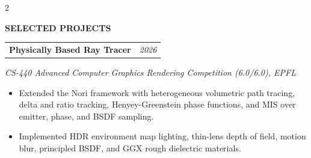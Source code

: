 \documentclass[10pt, letterpaper]{article}
\makeatletter
\newcommand{\sectionlabel}[1]{%
  {\fontsize{9.5pt}{11pt}\selectfont\bfseries\MakeUppercase{#1}}%
}
\newenvironment{cvsection}[1]{%
  \par\vspace{0.86\baselineskip}%
  \Needspace{3\baselineskip}%
  \setcolumnwidth{1.10in,\fill}%
  \begin{paracol}{2}%
  \raggedright\sectionlabel{#1}%
  \switchcolumn
}{%
  \end{paracol}%
}
\newcommand{\externalicon}[1]{%
  \href{#1}{\raisebox{0.12ex}{\normalfont\scriptsize\faExternalLink*}}%
}
\newcommand{\researchentry}[2]{%
  \noindent\begin{tabularx}{\linewidth}{@{}Xr@{}}
    \textbf{#1} & \textit{#2}
  \end{tabularx}%
}
\newcommand{\projectentry}[2]{%
  \noindent\begin{tabularx}{\linewidth}{@{}Xr@{}}
    \textbf{#1} & \textit{#2}
  \end{tabularx}%
}
\makeatother
\begin{document}
\begin{cvsection}{Selected Projects}
\projectentry{Physically Based Ray Tracer}{2026}
\textit{CS-440 Advanced Computer Graphics Rendering Competition (6.0/6.0), {\small EPFL}}
\begin{itemize}
  \item Extended the Nori framework with heterogeneous volumetric path tracing, delta and ratio tracking, Henyey-Greenstein phase functions, and MIS over emitter, phase, and BSDF sampling.
  \item Implemented HDR environment map lighting, thin-lens depth of field, motion blur, principled BSDF, and GGX rough dielectric materials.
\end{itemize}

\vspace{0.58\baselineskip}



\end{cvsection}
\end{document}
